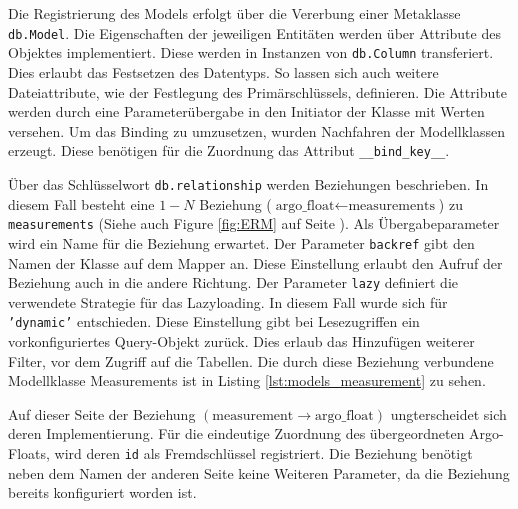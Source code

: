    
Die Registrierung des Models erfolgt über die Vererbung einer Metaklasse \texttt{db.Model}. Die Eigenschaften der jeweiligen Entitäten werden über Attribute des Objektes implementiert. Diese werden in Instanzen von \texttt{db.Column} transferiert. Dies erlaubt das Festsetzen des Datentyps. So lassen sich auch weitere Dateiattribute, wie der Festlegung des  Primärschlüssels, definieren. Die Attribute werden durch eine Parameterübergabe in den Initiator der Klasse mit Werten versehen.  
Um das Binding zu umzusetzen, wurden Nachfahren der Modellklassen erzeugt. Diese benötigen für die Zuordnung das Attribut \texttt{\_\_bind\_key\_\_}.

Über das Schlüsselwort \texttt{db.relationship} werden Beziehungen beschrieben. In diesem Fall besteht eine $1 - N$ Beziehung ($\mbox{argo\_float} \leftarrow \mbox{measurements}$) zu \texttt{measurements} (Siehe auch Figure \ref{fig:ERM} auf Seite \pageref{fig:ERM}). Als Übergabeparameter wird ein Name für die Beziehung erwartet. Der Parameter \texttt{backref} gibt den Namen der Klasse auf dem Mapper an. Diese Einstellung erlaubt den Aufruf der Beziehung auch in die andere Richtung. Der Parameter \texttt{lazy} definiert die verwendete Strategie für das Lazyloading. In diesem Fall wurde sich für \texttt{'dynamic'} entschieden. Diese Einstellung gibt bei Lesezugriffen ein vorkonfiguriertes Query-Objekt zurück. Dies erlaub das Hinzufügen weiterer Filter, vor dem Zugriff auf die Tabellen. Die durch diese Beziehung verbundene Modellklasse Measurements ist in Listing \ref{lst:models_measurement} zu sehen.


Auf dieser Seite der Beziehung   $\left( \mbox{measurement} \to \mbox{argo\_float} \right)$ ungterscheidet sich deren Implementierung. Für die eindeutige Zuordnung des übergeordneten Argo-Floats, wird deren \texttt{id} als Fremdschlüssel registriert. Die Beziehung benötigt neben dem Namen der anderen Seite keine Weiteren Parameter, da die Beziehung bereits konfiguriert worden ist.


